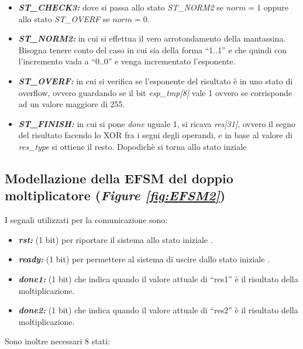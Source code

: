 \documentclass[]{IEEEtran}
\begin{document}
\begin{itemize}
\item \textit{\textbf{ST\_CHECK3:}} dove si passa allo stato \textit{ST\_NORM2} se \(\textit{norm} = 1\) oppure allo stato \textit{ST\_OVERF} se \(\textit{norm} = 0\).
\item \textit{\textbf{ST\_NORM2:}} in cui si effettua il vero arrotondamento della mantassina. Bisogna tenere conto del caso in cui sia della forma ``1..1'' e che quindi con l'incremento vada a ``0..0'' e  venga incrementato l'esponente.
\item {\it\bf ST\_OVERF:} in cui si verifica se l'esponente del risultato è in uno stato di overflow, ovvero guardando se il bit {\it esp\_tmp[8]} vale 1 ovvero se corrisponde ad un valore maggiore di 255.
\item {\it\bf ST\_FINISH:} in cui si pone {\it done} uguale 1, si ricava {\it res[31]}, ovvero il segno del risultato facendo lo XOR fra i segni degli operandi, e in base al valore di {\it res\_type} si ottiene il resto. Dopodichè si torna allo stato inziale
\end{itemize}


\subsection{Modellazione della EFSM del doppio moltiplicatore ({\it Figure \ref{fig:EFSM2}})}
I segnali utilizzati per la comunicazione sono:
\begin{itemize}
\item {\it\bf rst:} (1 bit) per riportare il sistema allo stato iniziale .
\item {\it\bf ready:} (1 bit) per permettere al sistema di uscire dallo stato iniziale .
\item {\it\bf done1:} (1 bit) che indica quando il valore attuale di ``res1'' è il risultato della moltiplicazione.
\item {\it\bf done2:} (1 bit) che indica quando il valore attuale di ``res2'' è il risultato della moltiplicazione.
\end{itemize}

Sono inoltre necessari 8 stati:
\end{document}
